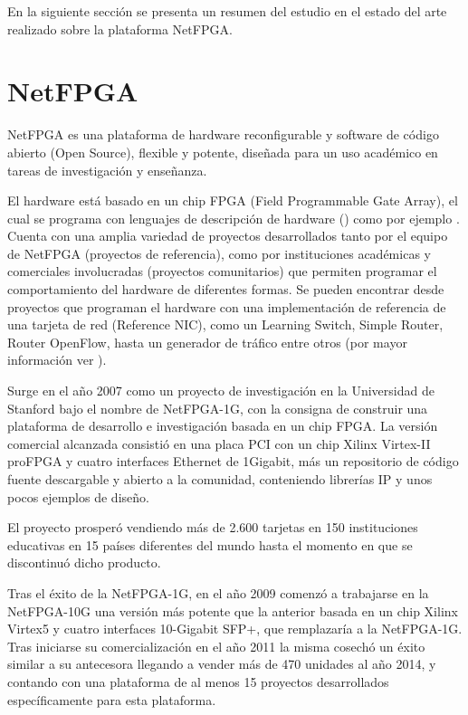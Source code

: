 En la siguiente secci\'on se presenta un resumen del estudio en el estado del arte realizado sobre la plataforma NetFPGA.

\section{NetFPGA}
\label{section2.9}

NetFPGA \cite{NetFPGA} es una plataforma de hardware reconfigurable y software de c\'odigo abierto  
 (Open Source), flexible y potente, diseñada para un uso académico en tareas de investigación y enseñanza.

El hardware est\'a basado en un chip FPGA (Field Programmable Gate Array), el cual se programa con lenguajes de descripci\'on de hardware () como por ejemplo . Cuenta con una amplia variedad de proyectos desarrollados tanto por el equipo de NetFPGA (proyectos de referencia), como por instituciones académicas y comerciales involucradas (proyectos comunitarios) que permiten programar el comportamiento del hardware  de diferentes formas. Se pueden encontrar desde proyectos que programan el hardware con una implementación de referencia de una tarjeta de red (Reference NIC), como un Learning Switch, Simple Router, Router OpenFlow, hasta un generador de tr\'afico entre otros  
 (por mayor informaci\'on ver \citep{NetFPGA2}).

Surge en el año 2007 como un proyecto de investigación en la Universidad de Stanford bajo el nombre de NetFPGA-1G, con la consigna de construir una plataforma de desarrollo e investigación basada en un chip FPGA. La versi\'on comercial alcanzada consisti\'o en una placa PCI con un chip Xilinx Virtex-II proFPGA y cuatro interfaces Ethernet de 1Gigabit, m\'as un repositorio de código fuente descargable y abierto a la comunidad, conteniendo librerías IP y unos pocos ejemplos de diseño.

El proyecto prosper\'o vendiendo m\'as de 2.600 tarjetas en 150 instituciones educativas en 15 países diferentes del mundo hasta el momento en que se discontinu\'o dicho producto.

Tras el éxito de la NetFPGA-1G, en el año 2009 comenzó a trabajarse en la NetFPGA-10G una versi\'on m\'as potente que la  anterior basada en un chip Xilinx Virtex5 y cuatro interfaces 10-Gigabit SFP+, que remplazaría a la NetFPGA-1G. Tras iniciarse su comercialización en el año 2011 la misma cosech\'o un éxito similar a su antecesora llegando a vender m\'as de 470 unidades al año 2014, y contando con una plataforma de al menos 15 proyectos desarrollados específicamente para esta plataforma.

